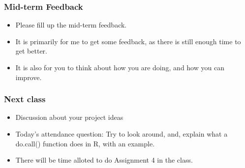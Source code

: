 \documentclass{beamer}
\begin{document}
\begin{frame}
\frametitle{Mid-term Feedback}
\begin{itemize}
\item Please fill up the mid-term feedback.
\item It is primarily for me to get some feedback, as there is still enough time to get better.
\item It is also for you to think about how you are doing, and how you can improve.
\end{itemize}
\end{frame}

\begin{frame}
\frametitle{Next class}
\begin{itemize}
\item Discussion about your project ideas
\item Today's attendance question: Try to look around, and, explain what a do.call() function does in R, with an example. 
\item There will be time alloted to do Assignment 4 in the class.
\end{itemize}
\end{frame}
\end{document}
